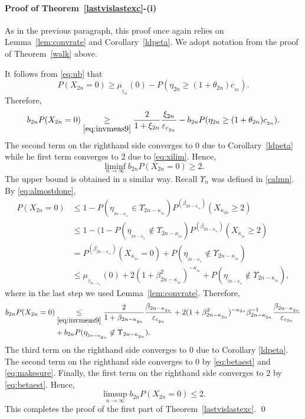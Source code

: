 \documentclass[12pt]{amsart}
\begin{document}
\paragraph{\bf Proof of Theorem~\ref{lastvislastexc}-(i)}
As in the previous paragraph, this proof once again relies on
Lemma~\ref{lem:convrate} and Corollary~\ref{ldpeta}. We adopt
notation from the proof of Theorem~\ref{walk} above.
\par
It follows from \eqref{eq:ub} that
$$P(X_{2n}=0) \geq \mu_{_{\xi_{2n}}}(0)-P(\eta_{2n}\ge (1+\theta_{2n})c_{_{2n}}).$$
Therefore,
$$b_{2n} P(X_{2n}=0)\underset{\eqref{eq:invmeas9}}{\ge}
\frac{2}{1+\xi_{2n}}\frac{\xi_{2n}}{{\varepsilon}_{c_{_{2n}}}}-b_{2n}
P(\eta_{2n}\ge (1+\theta_{2n})c_{_{2n}}).$$ The second term on the righthand
side converges to $0$ due to Corollary~\ref{ldpeta} while he first term
converges to $2$ due to \eqref{eq:xilim}. Hence,
$$ \liminf_{n\to\infty} b_{2n} P(X_{2n}=0)\ge 2.$$
The upper bound is obtained in a similar way. Recall $\Upsilon_n$
was defined in \eqref{calmn}. By \eqref{eq:almostdone},
\begin{align*}
P(X_{2n}=0)& \le 1-P(\eta_{_{2n-\kappa_{_{2n}}}}\in \Upsilon_{2n-\kappa_{_{2n}}})
P^{(\beta_{2n-\kappa_{_{2n}}})}(X_{\kappa_{2n}}\ge 2)\\
& \le 1-(1-P(\eta_{_{2n-\kappa_{_{2n}}}}\not\in \Upsilon_{2n-\kappa_{_{2n}}})P^{(\beta_{2n-\kappa_{_{2n}}})}(X_{\kappa_{_{2n}}}\geq 2)\\
& = P^{(\beta_{2n-\kappa_{_{2n}}})}(X_{\kappa_{_{2n}}}=0)+P(\eta_{_{2n-\kappa_{_{2n}}}}\not\in \Upsilon_{2n-\kappa_{_{2n}}})\\
&\le \mu_{_{\beta_{2n-\kappa_{_{2n}}}}}(0)+2(1+\beta_{2n-\kappa_{_{2n}}}^2)^{-\kappa_{_{2n}}}+
P(\eta_{_{2n-\kappa_{_{2n}}}}\not\in \Upsilon_{2n-\kappa_{_{2n}}}),
\end{align*}
where in the last step we used Lemma~\ref{lem:convrate}. Therefore,
\begin{eqnarray*}
b_{2n} P(X_{2n}=0)& \underset{\eqref{eq:invmeas9}}{\le}
{\frac {\displaystyle {2}}{\displaystyle {1+\beta_{2n-\kappa_{_{2n}}}} }}{\frac {\displaystyle {\beta_{2n-\kappa_{_{2n}}}}}{\displaystyle {{\varepsilon}_{c_{_{2n}}}} }}+2(1+\beta_{2n-\kappa_{_{2n}}}^2)^{-\kappa_{2n}}\beta_{2n-\kappa_{_{2n}}}^{-1}
{\frac {\displaystyle {\beta_{2n-\kappa_{_{2n}}}}}{\displaystyle {{\varepsilon}_{c_{2n}}} }}\\ &+b_{2n}P(\eta_{_{2n-\kappa_{_{2n}}}}\not\in \Upsilon_{2n-\kappa_{_{2n}}}).
\end{eqnarray*}
The third term on the righthand side converges to
$0$ due to Corollary \ref{ldpeta}. The second term on the righthand side converges to $0$ by
\eqref{eq:betaest} and \eqref{eq:makesure}. Finally, the first term
on the righthand side converges to $2$ by \eqref{eq:betaest}. Hence,
$$\limsup_{n\to\infty} b_{2n} P(X_{2n} =0)\le 2.$$
This completes the proof of the first part of Theorem~\ref{lastvislastexc}.
\qed
\\
$\mbox{}$
\end{document}
